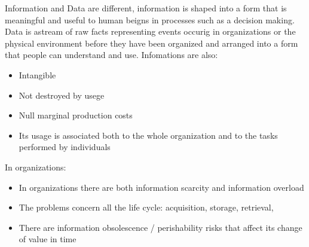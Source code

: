 \documentclass[12pt]{article}
\begin{document}
Information and Data are different, information is shaped into a form that is meaningful and useful to human beigns in processes such as a decision making. Data is astream of raw facts representing events occurig in organizations or the physical environment before they have been organized and arranged into a form that people can understand and use.
Infomations are also:
\begin{itemize}
  \item Intangible
  \item Not destroyed by usege
  \item Null marginal production costs
  \item Its usage is associated both to the whole organization and to the tasks performed by individuals
\end{itemize}
In organizations:
\begin{itemize}
  \item In organizations there are both information scarcity and information overload
  \item The problems concern all the life cycle: acquisition, storage, retrieval,
  \item There are information obsolescence / perishability risks that affect its change of value in time
\end{itemize}
\end{document}
